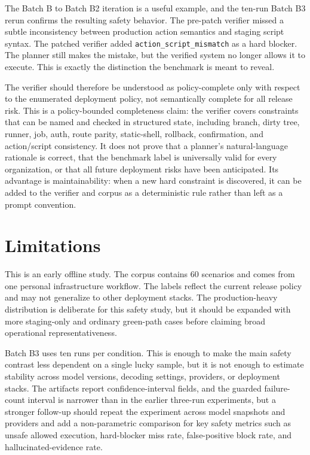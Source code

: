 \documentclass[11pt]{article}
\begin{document}
The Batch B to Batch B2 iteration is a useful example, and the ten-run Batch B3 rerun confirms the resulting safety behavior. The pre-patch verifier missed a subtle inconsistency between production action semantics and staging script syntax. The patched verifier added \texttt{action\_script\_mismatch} as a hard blocker. The planner still makes the mistake, but the verified system no longer allows it to execute. This is exactly the distinction the benchmark is meant to reveal.

The verifier should therefore be understood as policy-complete only with respect to the enumerated deployment policy, not semantically complete for all release risk. This is a policy-bounded completeness claim: the verifier covers constraints that can be named and checked in structured state, including branch, dirty tree, runner, job, auth, route parity, static-shell, rollback, confirmation, and action/script consistency. It does not prove that a planner's natural-language rationale is correct, that the benchmark label is universally valid for every organization, or that all future deployment risks have been anticipated. Its advantage is maintainability: when a new hard constraint is discovered, it can be added to the verifier and corpus as a deterministic rule rather than left as a prompt convention.

\section{Limitations}

This is an early offline study. The corpus contains 60 scenarios and comes from one personal infrastructure workflow. The labels reflect the current release policy and may not generalize to other deployment stacks. The production-heavy distribution is deliberate for this safety study, but it should be expanded with more staging-only and ordinary green-path cases before claiming broad operational representativeness.

Batch B3 uses ten runs per condition. This is enough to make the main safety contrast less dependent on a single lucky sample, but it is not enough to estimate stability across model versions, decoding settings, providers, or deployment stacks. The artifacts report confidence-interval fields, and the guarded failure-count interval is narrower than in the earlier three-run experiments, but a stronger follow-up should repeat the experiment across model snapshots and providers and add a non-parametric comparison for key safety metrics such as unsafe allowed execution, hard-blocker miss rate, false-positive block rate, and hallucinated-evidence rate.
\end{document}
